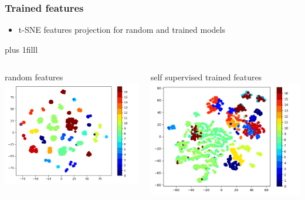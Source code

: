 \documentclass{beamer}
\begin{document}
\begin{frame}
  \frametitle{Trained features}
  
  \begin{itemize}
    \item t-SNE features projection for random and trained models
  \end{itemize} 

  \vskip 0pt plus 1filll 
  \begin{columns}
  
    \begin{column}{0.5\textwidth}
      random features
      \bigskip
      \includegraphics[scale=0.35]{../images/cnd_random.png}
    \end{column}

    \begin{column}{0.5\textwidth}
      self supervised trained features
      \bigskip
      \includegraphics[scale=0.35]{../images/cnd_trained.png}
    \end{column}
  
  \end{columns}
  
\end{frame}
\end{document}
